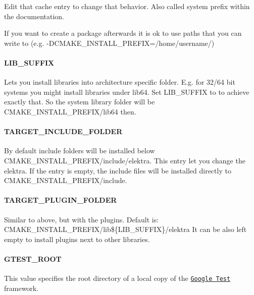 Edit that cache entry to change that behavior. Also called system prefix within the documentation.

If you want to create a package afterwards it is ok to use paths that you can write to (e.\+g. {\ttfamily -\/\+D\+C\+M\+A\+K\+E\+\_\+\+I\+N\+S\+T\+A\+L\+L\+\_\+\+P\+R\+E\+F\+IX=/home/username/})

\paragraph*{{\ttfamily L\+I\+B\+\_\+\+S\+U\+F\+F\+IX}}

Lets you install libraries into architecture specific folder. E.\+g. for 32/64 bit systems you might install libraries under {\ttfamily lib64}. Set {\ttfamily L\+I\+B\+\_\+\+S\+U\+F\+F\+IX} to {} to achieve exactly that. So the system library folder will be {\ttfamily C\+M\+A\+K\+E\+\_\+\+I\+N\+S\+T\+A\+L\+L\+\_\+\+P\+R\+E\+F\+I\+X/lib64} then.

\paragraph*{{\ttfamily T\+A\+R\+G\+E\+T\+\_\+\+I\+N\+C\+L\+U\+D\+E\+\_\+\+F\+O\+L\+D\+ER}}

By default include folders will be installed below {\ttfamily C\+M\+A\+K\+E\+\_\+\+I\+N\+S\+T\+A\+L\+L\+\_\+\+P\+R\+E\+F\+I\+X/include/elektra}. This entry let you change the elektra. If the entry is empty, the include files will be installed directly to {\ttfamily C\+M\+A\+K\+E\+\_\+\+I\+N\+S\+T\+A\+L\+L\+\_\+\+P\+R\+E\+F\+I\+X/include}.

\paragraph*{{\ttfamily T\+A\+R\+G\+E\+T\+\_\+\+P\+L\+U\+G\+I\+N\+\_\+\+F\+O\+L\+D\+ER}}

Similar to above, but with the plugins. Default is\+: {\ttfamily C\+M\+A\+K\+E\+\_\+\+I\+N\+S\+T\+A\+L\+L\+\_\+\+P\+R\+E\+F\+I\+X/lib\$\{L\+I\+B\+\_\+\+S\+U\+F\+F\+IX\}/elektra} It can be also left empty to install plugins next to other libraries.

\paragraph*{{\ttfamily G\+T\+E\+S\+T\+\_\+\+R\+O\+OT}}

This value specifies the root directory of a local copy of the \href{https://github.com/google/googletest}{\tt Google Test} framework.


